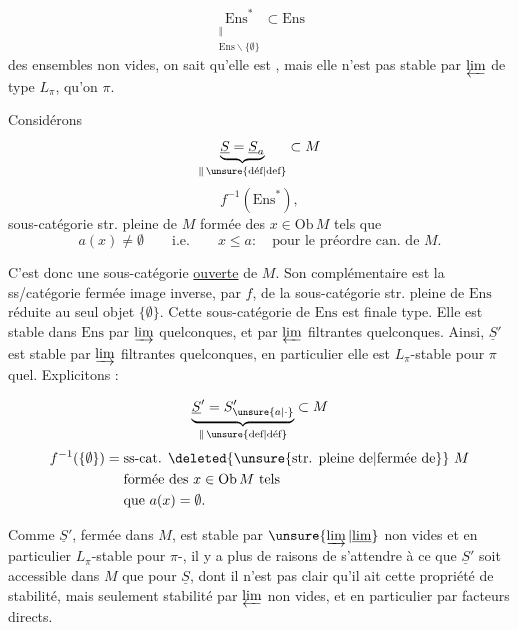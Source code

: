 
\[
\underset{\substack{\Vert\\ \mathrm{Ens}\smallsetminus\{\emptyset\}}}{\mathrm{Ens}^{*}}
 \subset \mathrm{Ens}
\]
des ensembles non vides, on sait qu'elle est ,
 mais elle n'est pas stable par
$\varprojlim$ de type $L_{\pi}$,   qu'on
 $\pi$.

Considérons
\[
\underbrace{\underline S=\underline S_a}_{\Vert\,\text{\unsure{déf|def}}}\subset M
\]
\[
f^{-1}(\mathrm{Ens}^{*}),
\]
sous-catégorie str. pleine de $M$ formée des $x\in\mathrm{Ob}\,M$ tels que
\[
a(x)\ne\emptyset \qquad\text{i.e.}\qquad x\leq a:\quad
\text{pour le préordre can. de }M.
\]

C'est donc une sous-catégorie \uline{ouverte} de $M$.
Son complémentaire 
 est la ss/catégorie
fermée image inverse, par $f$, de la sous-catégorie str. pleine
\deleted{$\unsure{\{\emptyset\}}$} de $\mathrm{Ens}$ réduite au seul objet
$\{\emptyset\}$. Cette sous-catégorie de $\mathrm{Ens}$ est
  finale type.
Elle est stable dans $\mathrm{Ens}$ par $\varinjlim$ quelconques, et
par $\varprojlim$ filtrantes quelconques. Ainsi,
$\underline S'$ est stable  par $\varinjlim$
filtrantes quelconques, en particulier elle est $L_{\pi}$-stable pour
$\pi$  quel. Explicitons :

\[
\underbrace{\underline S'=S'_{\unsure{a|\cdot}}}_{\Vert\,\text{\unsure{def|déf}}}\subset M
\]
\[
\begin{aligned}
 f^{-1}(\{\emptyset\})={}&\text{ss-cat. \deleted{\unsure{str. pleine de|fermée de}} }M\\
 &\text{formée des }x\in\mathrm{Ob}\,M\text{ tels}\\
 &\text{que } a(x)=\emptyset .
\end{aligned}
\]

Comme $\underline S'$,  fermée dans $M$, est
stable par $\unsure{\varinjlim|\underline{\lim}}$ non vides et en
particulier $L_{\pi}$-stable pour $\pi$-, il y a plus de raisons de
s'attendre à ce que $\underline S'$ soit accessible dans $M$ que pour
 $\underline S$, 
dont il n'est pas clair qu'il ait cette propriété de stabilité, mais
seulement stabilité par $\varprojlim$ non vides, et en particulier par
facteurs directs.

